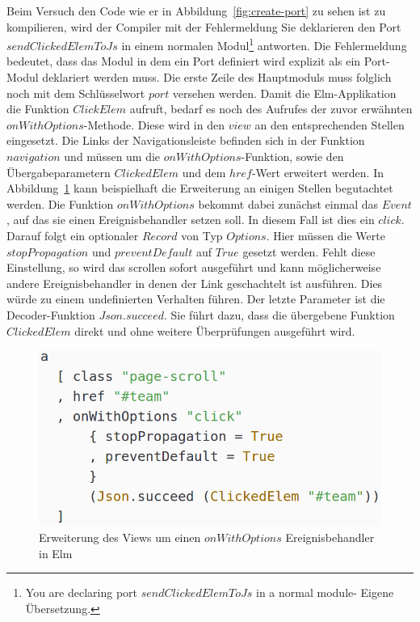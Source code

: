 Beim Versuch den Code wie er in Abbildung~\ref{fig:create-port} zu sehen ist zu kompilieren, wird der Compiler mit der Fehlermeldung \glqq Sie deklarieren den Port $sendClickedElemToJs$ in einem normalen Modul\grqq\footnote{\glqq You are declaring port $sendClickedElemToJs$ in a normal module\grqq - Eigene Übersetzung.} antworten. Die Fehlermeldung bedeutet, dass das Modul in dem ein Port definiert wird explizit als ein Port-Modul deklariert werden muss. Die erste Zeile des Hauptmoduls muss folglich noch mit dem Schlüsselwort $port$ versehen werden. Damit die Elm-Applikation die Funktion $ClickElem$ aufruft, bedarf es noch des Aufrufes der zuvor erwähnten $onWithOptions$-Methode. Diese wird in den $view$ an den entsprechenden Stellen eingesetzt. Die Links der Navigationsleiste befinden sich in der Funktion $navigation$ und müssen um die $onWithOptions$-Funktion, sowie den Übergabeparametern $ClickedElem$ und dem $href$-Wert erweitert werden. In Abbildung~\ref{fig:elm-view-onclick} kann beispielhaft die Erweiterung an einigen Stellen begutachtet werden. Die Funktion $onWithOptions$ bekommt dabei zunächst einmal das $Event$, auf das sie einen Ereignisbehandler setzen soll. In diesem Fall ist dies ein $click$. Darauf folgt ein optionaler $Record$ von Typ $Options$. Hier müssen die Werte $stopPropagation$ und $preventDefault$ auf $True$ gesetzt werden. Fehlt diese Einstellung, so wird das scrollen sofort ausgeführt und kann möglicherweise andere Ereignisbehandler in denen der Link geschachtelt ist ausführen. Dies würde zu einem undefinierten Verhalten führen. Der letzte Parameter ist die Decoder-Funktion $Json.succeed$. Sie führt dazu, dass die übergebene Funktion $ClickedElem$ direkt und ohne weitere Überprüfungen ausgeführt wird.
\begin{figure}[hbt]
\centering
\includegraphics[scale=0.4]{img/elm-view-onclick.png}
\caption{Erweiterung des Views um einen $onWithOptions$ Ereignisbehandler in Elm}\label{fig:elm-view-onclick}
\end{figure}
